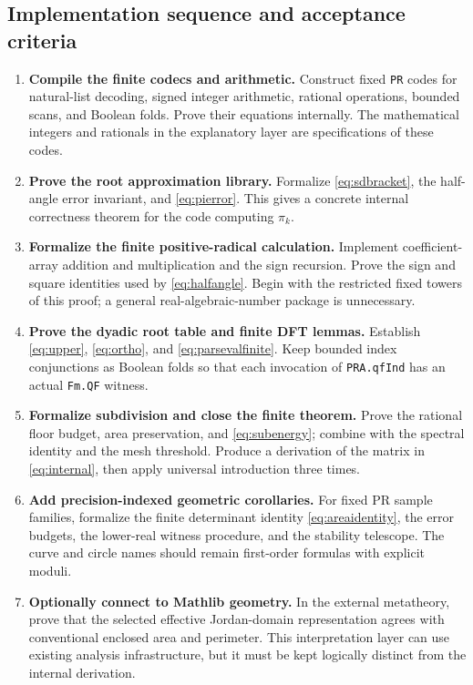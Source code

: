 \documentclass[11pt,a4paper]{article}
\theoremstyle{definition}
\begin{document}
\subsection{Implementation sequence and acceptance criteria}
\begin{enumerate}
\item \textbf{Compile the finite codecs and arithmetic.}
Construct fixed \texttt{PR} codes for natural-list decoding, signed
integer arithmetic, rational operations, bounded scans, and Boolean
folds. Prove their equations internally. The mathematical integers
and rationals in the explanatory layer are specifications of these
codes.

\item \textbf{Prove the root approximation library.}
Formalize \eqref{eq:sdbracket}, the half-angle error invariant, and
\eqref{eq:pierror}. This gives a concrete internal correctness theorem
for the code computing \(\pi_k\).

\item \textbf{Formalize the finite positive-radical calculation.}
Implement coefficient-array addition and multiplication and the
sign recursion. Prove the sign and square identities used by
\eqref{eq:halfangle}. Begin with the restricted fixed towers of this
proof; a general real-algebraic-number package is unnecessary.

\item \textbf{Prove the dyadic root table and finite DFT lemmas.}
Establish \eqref{eq:upper}, \eqref{eq:ortho}, and
\eqref{eq:parsevalfinite}. Keep bounded index conjunctions as Boolean
folds so that each invocation of \texttt{PRA.qfInd} has an actual
\texttt{Fm.QF} witness.

\item \textbf{Formalize subdivision and close the finite theorem.}
Prove the rational floor budget, area preservation, and
\eqref{eq:subenergy}; combine with the spectral identity and the mesh
threshold. Produce a derivation of the matrix in \eqref{eq:internal},
then apply universal introduction three times.

\item \textbf{Add precision-indexed geometric corollaries.}
For fixed PR sample families, formalize the finite determinant
identity \eqref{eq:areaidentity}, the error budgets, the lower-real
witness procedure, and the stability telescope. The curve and circle
names should remain first-order formulas with explicit moduli.

\item \textbf{Optionally connect to Mathlib geometry.}
In the external metatheory, prove that the selected effective
Jordan-domain representation agrees with conventional enclosed area
and perimeter. This interpretation layer can use existing analysis
infrastructure, but it must be kept logically distinct from the
internal derivation.
\end{enumerate}
\end{document}
